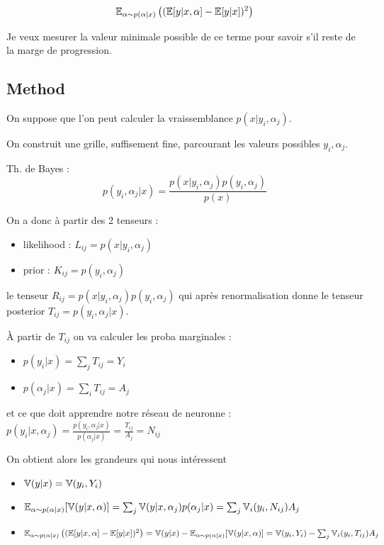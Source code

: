 $$\mathbb{E}_{\alpha \sim p(\alpha|x)} \left ((\mathbb{E} [y|x, \alpha]  - \mathbb{E}[y|x])^2\right )$$

Je veux mesurer la valeur minimale possible de ce terme pour savoir s'il reste de la marge de progression.

\subsection{Method} %
\label{sub:method}



On suppose que l'on peut calculer la vraissemblance $p(x|y_i, \alpha_j)$.

On construit une grille, suffisement fine, parcourant les valeurs possibles $y_i, \alpha_j$.

Th. de Bayes : 
$$
    p(y_i, \alpha_j | x) = \frac{p(x|y_i, \alpha_j) p(y_i, \alpha_j)}{p(x)}
$$

On a donc à partir des 2 tenseurs : 
\begin{itemize}
	\item likelihood : $L_{ij} = p(x|y_i, \alpha_j)$
	\item prior : $K_{ij} = p(y_i, \alpha_j)$ 
\end{itemize}

le tenseur $ R_{ij} = p(x|y_i, \alpha_j) p(y_i, \alpha_j) $ 
qui après renormalisation donne le tenseur posterior $ T_{ij} = p(y_i, \alpha_j | x)$.

À partir de $T_{ij}$ on va calculer les proba marginales :
\begin{itemize}
	\item $p(y_i | x) = \sum_j T_{ij} = Y_i$
	\item $p(\alpha_j | x) = \sum_i T_{ij} = A_j$
\end{itemize}

et ce que doit apprendre notre réseau de neuronne : $p(y_i | x, \alpha_j) = \frac{p(y_i, \alpha_j | x)}{p(\alpha_j | x)} = \frac{T_{ij}}{A_j} = N_{ij}$

On obtient alors les grandeurs qui nous intéressent
\begin{itemize}
	\item $ \mathbb{V}(y|x) = \mathbb{V}(y_i, Y_i) $
	\item $ \mathbb{E}_{\alpha \sim p(\alpha|x)}[ \mathbb{V}(y|x, \alpha) ] = \sum_j \mathbb{V}(y|x, \alpha_j) p(\alpha_j | x) = \sum_j \mathbb{V}_i(y_i, N_{ij}) A_j$
	\item $\mathbb{E}_{\alpha \sim p(\alpha|x)} \left ((\mathbb{E} [y|x, \alpha]  - \mathbb{E}[y|x])^2\right ) = \mathbb{V}(y|x) - \mathbb{E}_{\alpha \sim p(\alpha|x)}[ \mathbb{V}(y|x, \alpha) ] = \mathbb{V}(y_i, Y_i) - \sum_j \mathbb{V}_i(y_i, T_{ij}) A_j$
\end{itemize}



